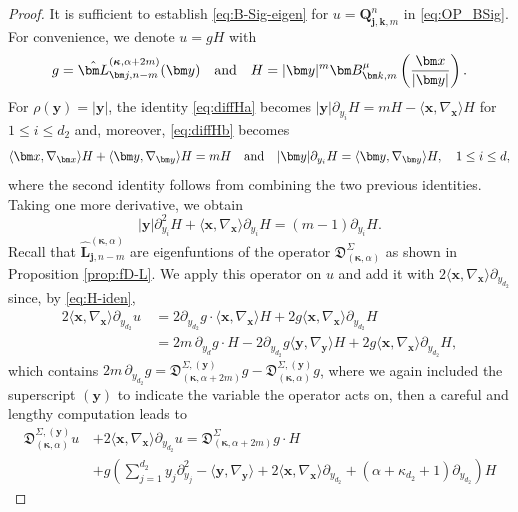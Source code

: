 \documentclass{amsart}
\theoremstyle{remark}
\def\la{{\langle}}
\def\ra{{\rangle}}
\def\fD{{\mathfrak D}}
\def\a{{\alpha}}
\def\k{{\kappa}}
\def\la{{\langle}}
\def\ra{{\rangle}}
\def\jb{{\bm j}}
\def\kb{{\bm k}}
\def\xb{{\bm x}}
\def\yb{{\bm y}}
\def\Lb{{\bm L}}
\def\Qb{{\bm Q}}
\def\bk{{\boldsymbol{\kappa}}}
\begin{document}
\begin{proof}
It is sufficient to establish \eqref{eq:B-Sig-eigen} for $u = \Qb_{\jb,\kb,m}^n$ in \eqref{eq:OP_BSig}. For convenience, we denote 
$u = g H$ with 
$$
g = \hat \Lb_{\bm j, n-m}^{(\bk, \alpha+2m)}(\bm y) \quad \hbox{and}\quad 
H =  |\bm y|^m \bm B_{\bm k, m}^\mu \left(\frac{\bm x}{|\bm y|}\right).
$$ 
For $\rho(\yb) = |\yb|$, the identity \eqref{eq:diffHa} becomes $|\yb| \partial_{y_i} H = m H - \la \xb, \nabla_\xb \ra H$ for $1 \le i \le d_2$ and, moreover, \eqref{eq:diffHb} becomes 
\begin{equation} \label{eq:H-iden}
   \la \xb, \nabla_\xb \ra H +  \la \yb, \nabla_\yb \ra H = m H \quad \hbox{and}\quad  |\yb| \partial_{y_i} H = \la \yb, \nabla_{\yb} \ra H,
    \quad 1 \le i \le d, 
\end{equation}
where the second identity follows from combining the two previous identities. Taking one more derivative, we obtain
\begin{equation} \label{eq:H-iden2}
  | \yb| \partial_{y_i}^2 H + \la \xb, \nabla_\xb \ra \partial_{y_i} H = (m-1)\partial_{y_i} H. 
\end{equation}
Recall that $\hat \Lb_{\bm j, n-m}^{(\bk, \alpha)}$ are eigenfuntions of the operator $\fD_{(\bk,\alpha)}^\Sigma$ as shown 
in Proposition \ref{prop:fD-L}. We apply this operator on $u$ and add it with $2\la \xb,\nabla_\xb\ra \partial_{y_{d_2}}$ since,
by \eqref{eq:H-iden},
\begin{align*}
  2\la \xb,\nabla_\xb\ra \partial_{y_{d_2}} u \, & = 2 \partial_{y_{d_2}} g \cdot \la \xb,\nabla_\xb\ra H 
      + 2g \la \xb,\nabla_\xb\ra \partial_{y_{d_2}} H \\
& = 2m\, \partial_{y_d} g\cdot  H - 2 \partial_{y_{d_2}} g \la \yb,\nabla_\yb\ra  H + 2 g  \la \xb,\nabla_\xb\ra \partial_{y_{d_2}} H, 
\end{align*} 
which contains $2m \, \partial_{y_{d_2}} g = \fD_{(\bk, \alpha+2m)}^{\Sigma, (\yb)} g - \fD_{(\bk, \alpha)}^{\Sigma, (\yb)} g$, 
where we again included the superscript $(\yb)$ to indicate the variable the operator acts on, then a careful 
and lengthy computation leads to
\begin{align*}
  \fD_{(\bk,\alpha)}^{\Sigma, (\yb)} u \, & +  2\la \xb,\nabla_\xb\ra \partial_{y_{d_2}} u = 
     \fD_{(\bk,\alpha+2m)}^\Sigma g \cdot H  \\
   &  + g \left( \sum_{j=1}^{d_2} y_j \partial_{y_j}^2  - \la \yb, \nabla_{\yb}\ra  
      + 2 \la \xb, \nabla_\xb \ra \partial_{y_{d_2}}  + (\a + \k_{d_2}+1) \partial_{y_{d_2}}   \right) H 

\end{align*}
\end{proof}
\end{document}
